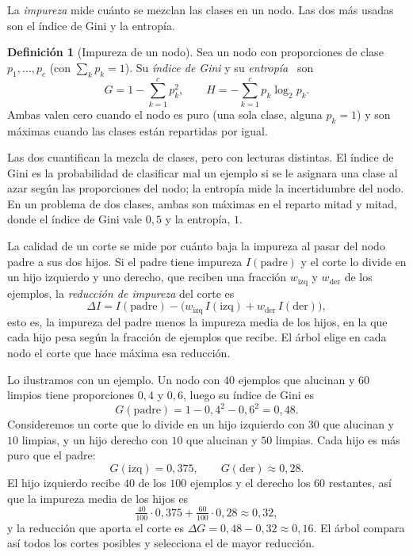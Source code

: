 \documentclass[12pt,a4paper]{report}
\theoremstyle{definition}
\newtheorem{definicion}{Definición}
\begin{document}
La  \emph{impureza} mide cuánto se mezclan las clases en un nodo. Las dos más usadas son el índice de Gini y la entropía.

\begin{definicion}[Impureza de un nodo]
Sea un nodo con proporciones de clase $p_1,\dots,p_c$ (con $\sum_k p_k = 1$). Su \emph{índice de Gini}
y su \emph{entropía}~\cite{shannon1948entropy} son
\[
G = 1 - \sum_{k=1}^{c} p_k^2,\qquad H = -\sum_{k=1}^{c} p_k \log_2 p_k.
\]
Ambas valen cero cuando el nodo es puro (una sola clase, alguna $p_k=1$) y son máximas cuando las
clases están repartidas por igual.
\end{definicion}

\noindent Las dos cuantifican la mezcla de clases, pero con lecturas distintas. El índice de Gini es la
probabilidad de clasificar mal un ejemplo si se le asignara una clase al azar según las proporciones
del nodo; la entropía mide la incertidumbre del nodo. En un problema de dos clases, ambas son
máximas en el reparto mitad y mitad, donde el índice de Gini vale $0{,}5$ y la entropía, $1$.

La calidad de un corte se mide por cuánto baja la impureza al pasar del nodo padre a sus dos hijos. Si
el padre tiene impureza $I(\text{padre})$ y el corte lo divide en un hijo izquierdo y uno derecho, que
reciben una fracción $w_{\text{izq}}$ y $w_{\text{der}}$ de los ejemplos, la \emph{reducción de
impureza} del corte es
\begin{equation}
\Delta I = I(\text{padre})
         - \big(w_{\text{izq}}\,I(\text{izq}) + w_{\text{der}}\,I(\text{der})\big),
\label{eq:ganancia}
\end{equation}
esto es, la impureza del padre menos la impureza media de los hijos, en la que cada hijo pesa según la
fracción de ejemplos que recibe. El árbol elige en cada nodo el corte que hace máxima esa reducción.

Lo ilustramos con un ejemplo. Un nodo con $40$ ejemplos que alucinan y $60$ limpios tiene proporciones $0{,}4$
y $0{,}6$, luego su índice de Gini es
\[
G(\text{padre}) = 1 - 0{,}4^2 - 0{,}6^2 = 0{,}48.
\]
Consideremos un corte que lo divide en un hijo izquierdo con $30$ que alucinan y $10$ limpias, y un hijo
derecho con $10$ que alucinan y $50$ limpias. Cada hijo es más puro que el padre:
\[
G(\text{izq}) = 0{,}375, \qquad G(\text{der}) \approx 0{,}28.
\]
El hijo izquierdo recibe $40$ de los $100$ ejemplos y el derecho los $60$ restantes, así que la impureza
media de los hijos es
\[
\tfrac{40}{100}\cdot 0{,}375 + \tfrac{60}{100}\cdot 0{,}28 \approx 0{,}32,
\]
y la reducción que aporta el corte es $\Delta G = 0{,}48 - 0{,}32 \approx 0{,}16$. El árbol compara
así todos los cortes posibles y selecciona el de mayor reducción.
\end{document}
